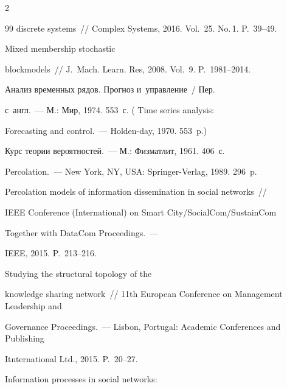 \begin{multicols}{2}
{{\begin{thebibliography}{99}
discrete systems~// Complex Systems, 2016. Vol.~25. No.\,1. P.~39--49.







 Mixed membership stochastic 


blockmodels~// J.~Mach. Learn. Res, 2008. Vol.~9. P.~1981--2014.




 Анализ временных рядов. Прогноз и~управление~/ Пер. 


с~англ.~--- М.: Мир, 1974. 553~с. ( Time series analysis: 


Forecasting and control.~--- Holden-day, 1970. 553~p.)




 Курс теории вероятностей.~--- М.: Физматлит, 1961. 406~с.




 Percolation.~--- New York, NY, USA: Springer-Verlag, 1989. 296~p.







 Percolation models of information dissemination in social networks~// 


IEEE Conference (International) on Smart City/SocialCom/SustainCom 


Together with DataCom Proceedings.~--- 


IEEE, 2015. P.~213--216.




 Studying the structural topology of the 


knowledge sharing network~// 11th European Conference on Management Leadership and 


Governance Proceedings.~--- Lisbon, Portugal: Academic Conferences and Publishing 


Itnternational Ltd., 2015. P.~20--27.







 Information processes in social networks: 



\end{thebibliography}}}
\end{multicols}
